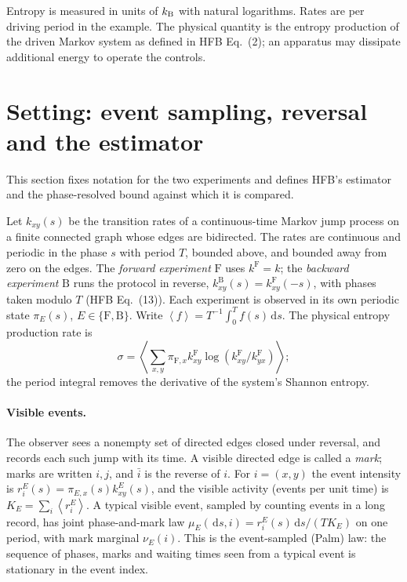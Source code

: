 \documentclass[11pt,a4paper]{article}
\newcommand{\av}[1]{\left\langle #1\right\rangle}
\newcommand{\F}{\mathrm F}
\newcommand{\B}{\mathrm B}
\newcommand{\dd}{\,\mathrm d}
\begin{document}
Entropy is measured in units of $k_{\rm B}$ with natural logarithms. Rates are per driving period in the example. The physical quantity is the entropy production of the driven Markov system as defined in HFB Eq.~(2); an apparatus may dissipate additional energy to operate the controls.

\section{Setting: event sampling, reversal and the estimator}\label{sec:setup}
This section fixes notation for the two experiments and defines HFB's estimator and the phase-resolved bound against which it is compared.

Let $k_{xy}(s)$ be the transition rates of a continuous-time Markov jump process on a finite connected graph whose edges are bidirected. The rates are continuous and periodic in the phase $s$ with period $T$, bounded above, and bounded away from zero on the edges. The \emph{forward experiment} $\F$ uses $k^\F=k$; the \emph{backward experiment} $\B$ runs the protocol in reverse, $k^\B_{xy}(s)=k^\F_{xy}(-s)$, with phases taken modulo $T$ (HFB Eq.~(13)). Each experiment is observed in its own periodic state $\pi_E(s)$, $E\in\{\F,\B\}$. Write $\av{f}=T^{-1}\int_0^T f(s)\dd s$. The physical entropy production rate is
\begin{equation}
\sigma=\av{\sum_{x,y}\pi_{\F,x} k_{xy}^\F\log(k_{xy}^\F/k_{yx}^\F)} ;
\label{eq:epr}
\end{equation}
the period integral removes the derivative of the system's Shannon entropy.

\paragraph{Visible events.} The observer sees a nonempty set of directed edges closed under reversal, and records each such jump with its time. A visible directed edge is called a \emph{mark}; marks are written $i,j$, and $\bar i$ is the reverse of $i$. For $i=(x,y)$ the event intensity is $r^E_i(s)=\pi_{E,x}(s)k^E_{xy}(s)$, and the visible activity (events per unit time) is $K_E=\sum_i\av{r_i^E}$. A typical visible event, sampled by counting events in a long record, has joint phase-and-mark law $\mu_E(\dd s,i)=r_i^E(s)\dd s/(TK_E)$ on one period, with mark marginal $\nu_E(i)$. This is the event-sampled (Palm) law: the sequence of phases, marks and waiting times seen from a typical event is stationary in the event index.
\end{document}
